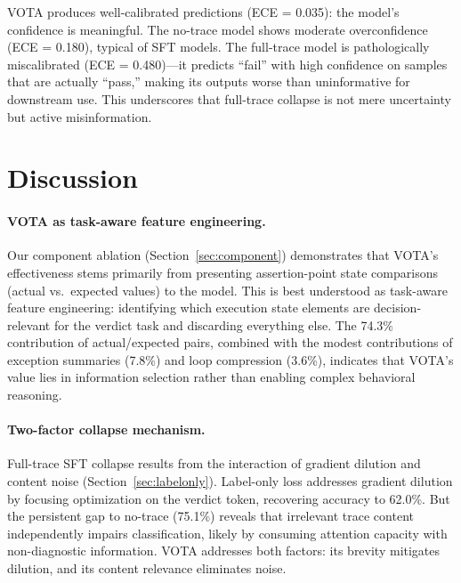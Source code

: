 \documentclass[11pt]{article}
\begin{document}
VOTA produces well-calibrated predictions (ECE = 0.035): the model's confidence is meaningful. The no-trace model shows moderate overconfidence (ECE = 0.180), typical of SFT models. The full-trace model is pathologically miscalibrated (ECE = 0.480)---it predicts ``fail'' with high confidence on samples that are actually ``pass,'' making its outputs worse than uninformative for downstream use. This underscores that full-trace collapse is not mere uncertainty but active misinformation.

\section{Discussion}

\paragraph{VOTA as task-aware feature engineering.}
Our component ablation (Section~\ref{sec:component}) demonstrates that VOTA's effectiveness stems primarily from presenting assertion-point state comparisons (actual vs.\ expected values) to the model. This is best understood as task-aware feature engineering: identifying which execution state elements are decision-relevant for the verdict task and discarding everything else. The 74.3\% contribution of actual/expected pairs, combined with the modest contributions of exception summaries (7.8\%) and loop compression (3.6\%), indicates that VOTA's value lies in information selection rather than enabling complex behavioral reasoning.

\paragraph{Two-factor collapse mechanism.}
Full-trace SFT collapse results from the interaction of gradient dilution and content noise (Section~\ref{sec:labelonly}). Label-only loss addresses gradient dilution by focusing optimization on the verdict token, recovering accuracy to 62.0\%. But the persistent gap to no-trace (75.1\%) reveals that irrelevant trace content independently impairs classification, likely by consuming attention capacity with non-diagnostic information. VOTA addresses both factors: its brevity mitigates dilution, and its content relevance eliminates noise.
\end{document}
